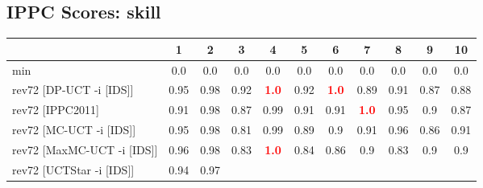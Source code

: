 \documentclass{article}
\begin{document}
\bigskip

\subsection*{IPPC Scores: skill}

\begin{tabular}{|l|r@{$\pm$}rr@{$\pm$}rr@{$\pm$}rr@{$\pm$}rr@{$\pm$}rr@{$\pm$}rr@{$\pm$}rr@{$\pm$}rr@{$\pm$}rr@{$\pm$}r|}
\hline

& \multicolumn{2}{c}{1}
& \multicolumn{2}{c}{2}
& \multicolumn{2}{c}{3}
& \multicolumn{2}{c}{4}
& \multicolumn{2}{c}{5}
& \multicolumn{2}{c}{6}
& \multicolumn{2}{c}{7}
& \multicolumn{2}{c}{8}
& \multicolumn{2}{c}{9}
& \multicolumn{2}{c|}{10}
\\
\hline
\hline
min
& \multicolumn{2}{c}{0.0}
& \multicolumn{2}{c}{0.0}
& \multicolumn{2}{c}{0.0}
& \multicolumn{2}{c}{0.0}
& \multicolumn{2}{c}{0.0}
& \multicolumn{2}{c}{0.0}
& \multicolumn{2}{c}{0.0}
& \multicolumn{2}{c}{0.0}
& \multicolumn{2}{c}{0.0}
& \multicolumn{2}{c|}{0.0}
\\
rev72 [DP-UCT -i [IDS]]
& \multicolumn{2}{c}{0.95}
& \multicolumn{2}{c}{0.98}
& \multicolumn{2}{c}{0.92}
& \multicolumn{2}{c}{\textbf{\textcolor{red}{1.0}}}
& \multicolumn{2}{c}{0.92}
& \multicolumn{2}{c}{\textbf{\textcolor{red}{1.0}}}
& \multicolumn{2}{c}{0.89}
& \multicolumn{2}{c}{0.91}
& \multicolumn{2}{c}{0.87}
& \multicolumn{2}{c|}{0.88}
\\
rev72 [IPPC2011]
& \multicolumn{2}{c}{0.91}
& \multicolumn{2}{c}{0.98}
& \multicolumn{2}{c}{0.87}
& \multicolumn{2}{c}{0.99}
& \multicolumn{2}{c}{0.91}
& \multicolumn{2}{c}{0.91}
& \multicolumn{2}{c}{\textbf{\textcolor{red}{1.0}}}
& \multicolumn{2}{c}{0.95}
& \multicolumn{2}{c}{0.9}
& \multicolumn{2}{c|}{0.87}
\\
rev72 [MC-UCT -i [IDS]]
& \multicolumn{2}{c}{0.95}
& \multicolumn{2}{c}{0.98}
& \multicolumn{2}{c}{0.81}
& \multicolumn{2}{c}{0.99}
& \multicolumn{2}{c}{0.89}
& \multicolumn{2}{c}{0.9}
& \multicolumn{2}{c}{0.91}
& \multicolumn{2}{c}{0.96}
& \multicolumn{2}{c}{0.86}
& \multicolumn{2}{c|}{0.91}
\\
rev72 [MaxMC-UCT -i [IDS]]
& \multicolumn{2}{c}{0.96}
& \multicolumn{2}{c}{0.98}
& \multicolumn{2}{c}{0.83}
& \multicolumn{2}{c}{\textbf{\textcolor{red}{1.0}}}
& \multicolumn{2}{c}{0.84}
& \multicolumn{2}{c}{0.86}
& \multicolumn{2}{c}{0.9}
& \multicolumn{2}{c}{0.83}
& \multicolumn{2}{c}{0.9}
& \multicolumn{2}{c|}{0.9}
\\
rev72 [UCTStar -i [IDS]]
& \multicolumn{2}{c}{0.94}
& \multicolumn{2}{c}{0.97}

\end{tabular}
\end{document}

